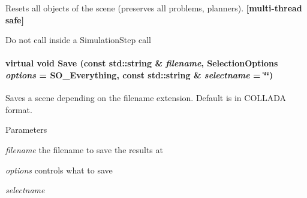 Resets all objects of the scene (preserves all problems, planners). {\bfseries \mbox{[}multi-\/thread safe\mbox{]}} 

Do not call inside a SimulationStep call \hypertarget{classOpenRAVE_1_1EnvironmentBase_a3ad623878891c5dc28f355d1cf348793}{
\paragraph[{Save}]{\setlength{\rightskip}{0pt plus 5cm}virtual void Save (const std::string \& {\em filename}, \/  {\bf SelectionOptions} {\em options} = {\ttfamily SO\_\-Everything}, \/  const std::string \& {\em selectname} = {\ttfamily \char`\"{}\char`\"{}})}\hfill}
\label{classOpenRAVE_1_1EnvironmentBase_a3ad623878891c5dc28f355d1cf348793}


Saves a scene depending on the filename extension. Default is in COLLADA format. 


\begin{DoxyParams}{Parameters}
\item[{\em filename}]the filename to save the results at \item[{\em options}]controls what to save \item[{\em selectname}]\end{DoxyParams}

